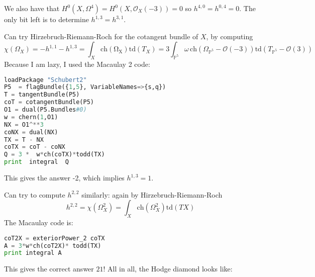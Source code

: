 We also have that $H^0(X, \Omega^4)=H^0(X, \mathcal{O}_{X}(-3))=0$ so $h^{4,0}=h^{0,4}=0$. The only bit left is to determine $h^{1,3}=h^{3,1}$. 

Can try Hirzebruch-Riemann-Roch for the cotangent bundle of $X$, by computing $$\chi(\Omega_{X})=-h^{1,1}-h^{1,3}=\int _{X}\mathrm{ch(\Omega_{X})}\mathrm{td}(T_{X})=3\int _{\mathbb{P}^5} \omega \,\mathrm{ch}(\Omega_{\mathbb{P}^5}-\mathcal{O}(-3)) \mathrm{td}(T_{\mathbb{P}^5}-\mathcal{O}(3))  $$
Because I am lazy, I used the Macaulay 2 code: 

\begin{lstlisting}[language=Python]
loadPackage "Schubert2"
P5  = flagBundle({1,5}, VariableNames=>{s,q})
T = tangentBundle(P5)
coT = cotangentBundle(P5)
O1 = dual(P5.Bundles#0)
w = chern(1,O1)
NX = O1^**3
coNX = dual(NX)
TX = T - NX
coTX = coT - coNX
Q = 3 *  w*ch(coTX)*todd(TX)
print  integral  Q
\end{lstlisting}
This gives the answer -2, which implies $h^{1,3}=1$.

Can try to compute $h^{2,2}$ similarly: again by Hirzebruch-Riemann-Roch
$$h^{2,2}=\chi(\Omega_{X}^2)=\int_{X} \mathrm{ch}(\Omega^2_{X})\mathrm{td}(TX)  $$
The Macaulay code is: 

\begin{lstlisting}[language=Python] 
coT2X = exteriorPower_2 coTX
A = 3*w*ch(coT2X)* todd(TX)
print integral A
\end{lstlisting}
This gives the correct answer $21$! All in all, the Hodge diamond looks like: 

\begin{center}
\end{center}

